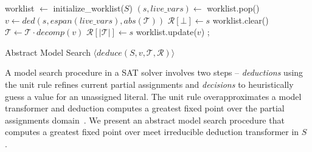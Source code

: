 \begin{algorithm2e}[t]
\DontPrintSemicolon
{}
\begin{small}
worklist $\leftarrow$ initialize\_worklist($S$) \;
{
  $(s,\mathit{live\_vars}) \leftarrow$ worklist.pop() \;
  $v \leftarrow ded(s, \mathit{espan}(\mathit{live\_vars}), \mathit{abs}(\mathcal{T}))$\;
   {
    $\mathcal{R}[\bot] \leftarrow s$ 
    \;
    worklist.clear() 
     \;
    \return \conflict \;
  }
  \uElse
  {
    $\mathcal{T} \leftarrow \mathcal{T} \cdot \mathit{decomp}(v)$ \; 
    $\mathcal{R}[|\mathcal{T}|] \leftarrow s$ \;
    worklist.update($v$) \; 
  }
}
 {
  \return \sat;
}
\lElse {
 \return \unknown \;
}
\end{small}
\caption{Abstract Model Search $\langle deduce(S,v,\mathcal{T},\mathcal{R}) \rangle$ \label{Alg:ms}}
\end{algorithm2e}
%  
A model search procedure in a SAT solver involves two steps -- {\em deductions} 
using the unit rule refines current partial assignments and 
{\em decisions} to heuristically guess a value for an unassigned 
literal.  The unit rule overapproximates a model transformer and deduction 
computes a greatest fixed point over the partial assignments
domain~\cite{dhk2013-popl}.  We present an abstract model search procedure 
that computes a greatest fixed point over meet irreducible deduction 
transformer in $S$ .  
%

